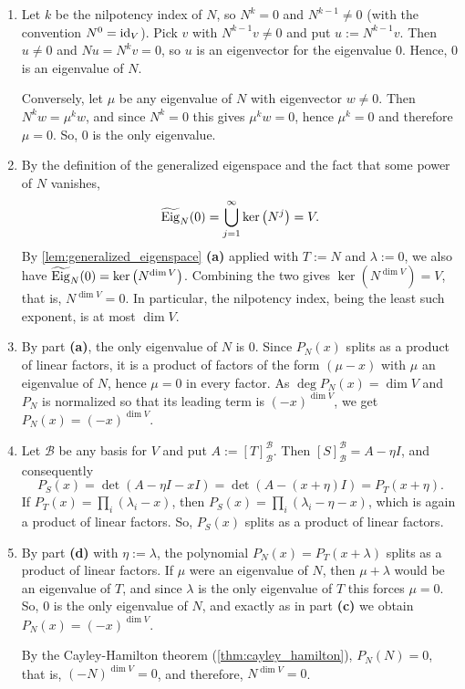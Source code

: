 \begin{exercisesolution}
\label{sol:nilpotent_properties}
\begin{enumerate}[label=\textbf{(\alph*)}]
    \item Let $k$ be the nilpotency index of $N$, so $N^k = 0$ and $N^{k-1} \neq 0$ (with the convention $N^0 = \operatorname{id}_V$). Pick $v$ with $N^{k-1} v \neq 0$ and put $u := N^{k-1} v$. Then $u \neq 0$ and $Nu = N^k v = 0$, so $u$ is an eigenvector for the eigenvalue $0$. Hence, $0$ is an eigenvalue of $N$.

    Conversely, let $\mu$ be any eigenvalue of $N$ with eigenvector $w \neq 0$. Then $N^k w = \mu^k w$, and since $N^k = 0$ this gives $\mu^k w = 0$, hence $\mu^k = 0$ and therefore $\mu = 0$. So, $0$ is the only eigenvalue.

    \item By the definition of the generalized eigenspace and the fact that some power of $N$ vanishes,
    \[
        \widetilde{\operatorname{Eig}}_N(0) = \bigcup_{j=1}^\infty \ker\left(N^j\right) = V.
    \]
    By \cref{lem:generalized_eigenspace} \textbf{(a)} applied with $T := N$ and $\lambda := 0$, we also have $\widetilde{\operatorname{Eig}}_N(0) = \ker\left(N^{\dim V}\right)$. Combining the two gives $\ker\left(N^{\dim V}\right) = V$, that is, $N^{\dim V} = 0$. In particular, the nilpotency index, being the least such exponent, is at most $\dim V$.

    \item By part \textbf{(a)}, the only eigenvalue of $N$ is $0$. Since $P_N(x)$ splits as a product of linear factors, it is a product of factors of the form $(\mu - x)$ with $\mu$ an eigenvalue of $N$, hence $\mu = 0$ in every factor. As $\deg P_N(x) = \dim V$ and $P_N$ is normalized so that its leading term is $(-x)^{\dim V}$, we get $P_N(x) = (-x)^{\dim V}$.

    \item Let $\mathcal{B}$ be any basis for $V$ and put $A := [T]_{\mathcal{B}}^{\mathcal{B}}$. Then $[S]_{\mathcal{B}}^{\mathcal{B}} = A - \eta I$, and consequently
    \[
        P_S(x) = \det\left(A - \eta I - x I\right) = \det\left(A - (x+\eta) I\right) = P_T(x + \eta).
    \]
    If $P_T(x) = \prod_i (\lambda_i - x)$, then $P_S(x) = \prod_i (\lambda_i - \eta - x)$, which is again a product of linear factors. So, $P_S(x)$ splits as a product of linear factors.

    \item By part \textbf{(d)} with $\eta := \lambda$, the polynomial $P_N(x) = P_T(x + \lambda)$ splits as a product of linear factors. If $\mu$ were an eigenvalue of $N$, then $\mu + \lambda$ would be an eigenvalue of $T$, and since $\lambda$ is the only eigenvalue of $T$ this forces $\mu = 0$. So, $0$ is the only eigenvalue of $N$, and exactly as in part \textbf{(c)} we obtain $P_N(x) = (-x)^{\dim V}$.

    By the Cayley-Hamilton theorem (\cref{thm:cayley_hamilton}), $P_N(N) = 0$, that is, $(-N)^{\dim V} = 0$, and therefore, $N^{\dim V} = 0$.
\end{enumerate}
\end{exercisesolution}

